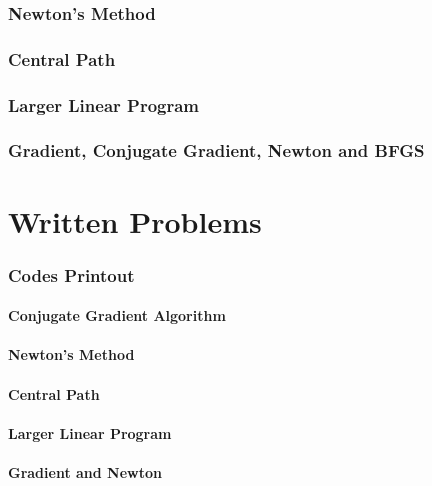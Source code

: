 \documentclass[11pt,a4paper]{article}
\begin{document}
\newpage
\section{Newton’s Method}

\newpage
\section{Central Path}


\newpage
\section{Larger Linear Program}

\newpage
\section{Gradient, Conjugate Gradient, Newton and BFGS}

\newpage
\part{Written Problems}

\newpage
\appendix
\section{Codes Printout}

\subsection{Conjugate Gradient Algorithm}


\newpage
\subsection{Newton’s Method}


\newpage
\subsection{Central Path}


\newpage
\subsection{Larger Linear Program}
%

\newpage
\subsection{Gradient and Newton}
%
\end{document}
